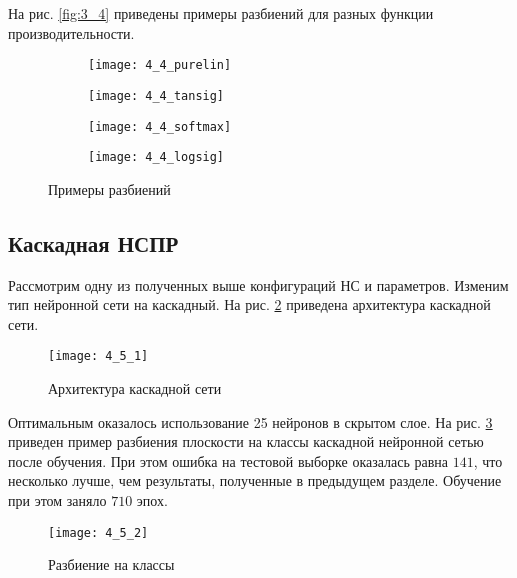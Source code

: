 На рис. \ref{fig:3_4} приведены примеры разбиений для разных функции производительности.
\vspace{-0.5cm}
\begin{figure}[H]
\begin{center}
	\begin{subfigure}[b]{0.49\textwidth}
		\texttt{[image: 4\_4\_purelin]}
		\caption{}
	\end{subfigure}
	\begin{subfigure}[b]{0.49\textwidth}
		\texttt{[image: 4\_4\_tansig]}
		\caption{}
	\end{subfigure}
	\begin{subfigure}[b]{0.49\textwidth}
		\texttt{[image: 4\_4\_softmax]}
		\caption{}
	\end{subfigure}
	\begin{subfigure}[b]{0.49\textwidth}
		\texttt{[image: 4\_4\_logsig]}
		\caption{}
	\end{subfigure}
	\caption{Примеры разбиений}
	\label{fig:4_4}
\end{center}
\end{figure}

\subsection{Каскадная НСПР}

Рассмотрим одну из полученных выше конфигураций НС и параметров. Изменим тип нейронной сети на каскадный. На рис. \ref{fig:4_5_1} приведена архитектура каскадной сети.

\begin{figure}[H]
\begin{center}
	\texttt{[image: 4\_5\_1]}
	\caption{Архитектура каскадной сети}
	\label{fig:4_5_1}
\end{center}
\end{figure}

\vspace{-0.5cm}
Оптимальным оказалось использование 25 нейронов в скрытом слое. На рис. \ref{fig:4_5_2} приведен пример разбиения плоскости на классы каскадной нейронной сетью после обучения. При этом ошибка  на тестовой выборке оказалась равна $141$, что несколько лучше, чем результаты, полученные в предыдущем разделе. Обучение при этом заняло $710$ эпох.
\vspace{-0.5cm}
\begin{figure}[H]
\begin{center}
	\texttt{[image: 4\_5\_2]}
	\caption{Разбиение на классы}
	\label{fig:4_5_2}
\end{center}
\end{figure}
\vspace{-1cm}

